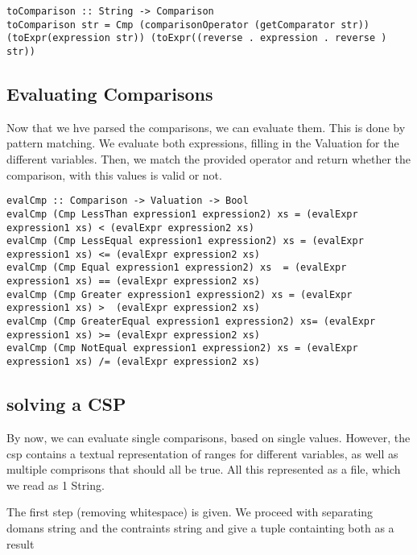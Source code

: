 \documentclass[a4paper,11pt]{article}
\begin{document}
\begin{lstlisting}
toComparison :: String -> Comparison
toComparison str = Cmp (comparisonOperator (getComparator str)) (toExpr(expression str)) (toExpr((reverse . expression . reverse ) str))
\end{lstlisting}

\subsection{Evaluating Comparisons}
	
Now that we hve parsed the comparisons, we can evaluate them. This is done by pattern matching. We evaluate both expressions, filling in the Valuation for the different variables. Then, we match the provided operator and return whether the comparison, with this values is valid or not.
\begin{lstlisting}
evalCmp :: Comparison -> Valuation -> Bool
evalCmp (Cmp LessThan expression1 expression2) xs = (evalExpr expression1 xs) < (evalExpr expression2 xs)
evalCmp (Cmp LessEqual expression1 expression2) xs = (evalExpr expression1 xs) <= (evalExpr expression2 xs)
evalCmp (Cmp Equal expression1 expression2) xs 	= (evalExpr expression1 xs) == (evalExpr expression2 xs)
evalCmp (Cmp Greater expression1 expression2) xs = (evalExpr expression1 xs) > 	(evalExpr expression2 xs)
evalCmp (Cmp GreaterEqual expression1 expression2) xs= (evalExpr expression1 xs) >= (evalExpr expression2 xs)
evalCmp (Cmp NotEqual expression1 expression2) xs = (evalExpr expression1 xs) /= (evalExpr expression2 xs)
\end{lstlisting}
\subsection{solving a CSP}

By now, we can evaluate single comparisons, based on single values. However, the csp contains a textual representation of ranges for different variables, as well as multiple comprisons that should all be true. All this represented as a file, which we read as 1 String.

The first step (removing whitespace) is given. We proceed with separating domans string and the contraints string and give a tuple containting both as a result
\end{document}
